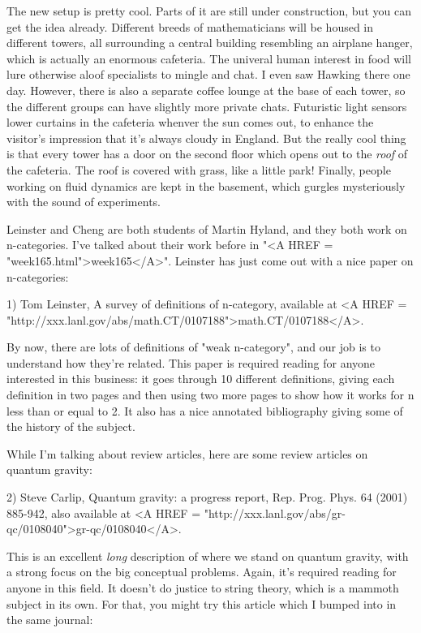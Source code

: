 The new setup is pretty cool.  Parts of it are still under construction,
but you can get the idea already.  Different breeds of mathematicians
will be housed in different towers, all surrounding a central building
resembling an airplane hanger, which is actually an enormous cafeteria.
The univeral human interest in food will lure otherwise aloof
specialists to mingle and chat.  I even saw Hawking there one day.
However, there is also a separate coffee lounge at the base of each
tower, so the different groups can have slightly more private chats.
Futuristic light sensors lower curtains in the cafeteria whenver the sun
comes out, to enhance the visitor's impression that it's always cloudy
in England.  But the really cool thing is that every tower has a door on
the second floor which opens out to the \emph{roof} of the cafeteria.  The
roof is covered with grass, like a little park!  Finally, people working
on fluid dynamics are kept in the basement, which gurgles mysteriously
with the sound of experiments.  

Leinster and Cheng are both students of Martin Hyland, and they
both work on n-categories.   I've talked about their work before
in "<A HREF = "week165.html">week165</A>".  Leinster has just come out with a nice paper on
n-categories:

1) Tom Leinster, A survey of definitions of n-category, available
at <A HREF = "http://xxx.lanl.gov/abs/math.CT/0107188">math.CT/0107188</A>.

By now, there are lots of definitions of "weak n-category", and
our job is to understand how they're related.  This paper is required
reading for anyone interested in this business: it goes through 10
different definitions, giving each definition in two pages and then
using two more pages to show how it works for n less than or equal to 2.
It also has a nice annotated bibliography giving some of the history
of the subject.

While I'm talking about review articles, here are some review
articles on quantum gravity:

2) Steve Carlip, Quantum gravity: a progress report,
Rep. Prog. Phys. 64 (2001) 885-942, also available at <A HREF = "http://xxx.lanl.gov/abs/gr-qc/0108040">gr-qc/0108040</A>.

This is an excellent \emph{long} description of where we stand on quantum
gravity, with a strong focus on the big conceptual problems.  Again,
it's required reading for anyone in this field.  It doesn't do justice
to string theory, which is a mammoth subject in its own.  For that, 
you might try this article which I bumped into in the same journal:

